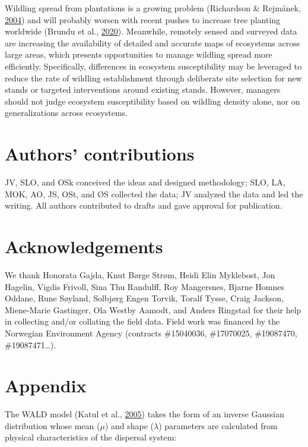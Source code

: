 \documentclass[
]{article}
\begin{document}
Wildling spread from plantations is a growing problem (Richardson \& Rejmánek, \protect\hyperlink{ref-richardsonConifersInvasiveAliens2004}{2004}) and will probably worsen with recent pushes to increase tree planting worldwide (Brundu et al., \protect\hyperlink{ref-brunduGlobalGuidelinesSustainable2020}{2020}).
Meanwhile, remotely sensed and surveyed data are increasing the availability of detailed and accurate maps of ecosystems across large areas, which presents opportunities to manage wildling spread more efficiently.
Specifically, differences in ecosystem susceptibility may be leveraged to
reduce the rate of wildling establishment through deliberate site selection for new stands or targeted interventions around existing stands.
However, managers should not judge ecosystem susceptibility based on wildling density alone, nor on generalizations across ecosystems.

\hypertarget{authors-contributions}{%
\section{Authors' contributions}\label{authors-contributions}}

JV, SLO, and OSk conceived the ideas and designed methodology; SLO, LA, MOK, AO, JS, OSt, and ØS collected the data; JV analyzed the data and led the writing. All authors contributed to drafts and gave approval for publication.

\hypertarget{acknowledgements}{%
\section{Acknowledgements}\label{acknowledgements}}

We thank Honorata Gajda, Knut Børge Strøm, Heidi Elin Myklebost, Jon Hagelin, Vigdis Frivoll, Sina Thu Randulff, Roy Mangersnes, Bjarne Homnes Oddane, Rune Søyland, Solbjørg Engen Torvik, Toralf Tysse, Craig Jackson, Miene-Marie Gastinger, Ola Westby Aamodt, and Anders Ringstad for their help in collecting and/or collating the field data. Field work was financed by the Norwegian Environment Agency (contracts \#15040036, \#17070025, \#19087470, \#19087471\ldots).

\newpage

\hypertarget{appendix}{%
\section{Appendix}\label{appendix}}

The WALD model (Katul et al., \protect\hyperlink{ref-katulMechanisticAnalyticalModels2005}{2005}) takes the form of an inverse Gaussian distribution whose mean (\(\mu\)) and shape (\(\lambda\)) parameters are calculated from physical characteristics of the dispersal system:
\end{document}
